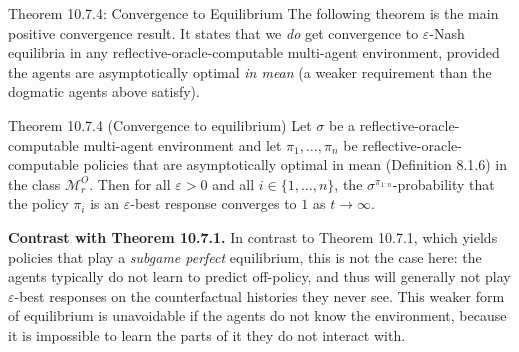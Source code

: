\documentclass[aspectratio=169,10pt]{beamer}
\newcommand{\Mc}{\mathcal{M}}
\begin{document}
\begin{frame}{Theorem 10.7.4: Convergence to Equilibrium}
  The following theorem is the main positive convergence result. It
  states that we \emph{do} get convergence to $\varepsilon$-Nash equilibria
  in any reflective-oracle-computable multi-agent environment, provided
  the agents are asymptotically optimal \emph{in mean} (a weaker
  requirement than the dogmatic agents above satisfy).
  \begin{block}{Theorem 10.7.4 (Convergence to equilibrium)}
    Let $\sigma$ be a reflective-oracle-computable multi-agent environment
    and let $\pi_1,\ldots,\pi_n$ be reflective-oracle-computable policies
    that are asymptotically optimal in mean (Definition 8.1.6) in the
    class $\Mc_r^O$. Then for all $\varepsilon>0$ and all
    $i\in\{1,\ldots,n\}$, the $\sigma^{\pi_{1:n}}$-probability that the
    policy $\pi_i$ is an $\varepsilon$-best response converges to $1$ as
    $t\to\infty$.
  \end{block}
  \textbf{Contrast with Theorem 10.7.1.} In contrast to Theorem 10.7.1,
  which yields policies that play a \emph{subgame perfect} equilibrium,
  this is not the case here: the agents typically do not learn to predict
  off-policy, and thus will generally not play $\varepsilon$-best
  responses on the counterfactual histories they never see. This weaker
  form of equilibrium is unavoidable if the agents do not know the
  environment, because it is impossible to learn the parts of it they do
  not interact with.
\end{frame}
\end{document}
